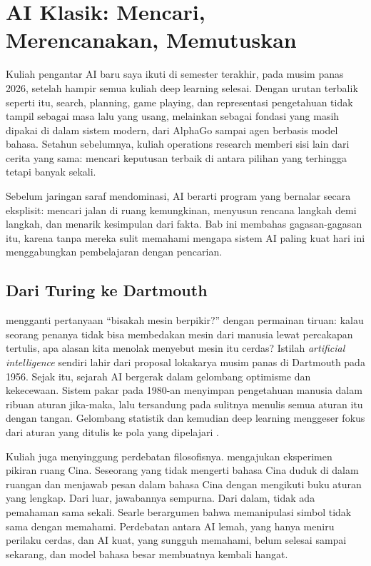 \chapter{AI Klasik: Mencari, Merencanakan, Memutuskan}
\label{ch:klasik}

Kuliah pengantar AI baru saya ikuti di semester terakhir, pada musim panas 2026, setelah hampir
semua kuliah deep learning selesai. Dengan urutan terbalik seperti itu, search, planning, game
playing, dan representasi pengetahuan tidak tampil sebagai masa lalu yang usang, melainkan sebagai
fondasi yang masih dipakai di dalam sistem modern, dari AlphaGo sampai agen berbasis model bahasa. Setahun sebelumnya, kuliah operations
research memberi sisi lain dari cerita yang sama: mencari keputusan terbaik di antara pilihan
yang terhingga tetapi banyak sekali.

Sebelum jaringan saraf mendominasi, AI berarti program yang bernalar secara eksplisit: mencari
jalan di ruang kemungkinan, menyusun rencana langkah demi langkah, dan menarik kesimpulan dari
fakta. Bab ini membahas gagasan-gagasan itu, karena tanpa mereka sulit memahami mengapa sistem AI
paling kuat hari ini menggabungkan pembelajaran dengan pencarian.

\section{Dari Turing ke Dartmouth}

\citet{turing1950} mengganti pertanyaan ``bisakah mesin berpikir?'' dengan permainan tiruan:
kalau seorang penanya tidak bisa membedakan mesin dari manusia lewat percakapan tertulis, apa
alasan kita menolak menyebut mesin itu cerdas? Istilah \emph{artificial intelligence} sendiri
lahir dari proposal lokakarya musim panas di Dartmouth pada 1956. Sejak itu, sejarah AI bergerak
dalam gelombang optimisme dan kekecewaan. Sistem pakar pada 1980-an menyimpan pengetahuan
manusia dalam ribuan aturan jika-maka, lalu tersandung pada sulitnya menulis semua aturan itu
dengan tangan. Gelombang statistik dan kemudian deep learning menggeser fokus dari aturan yang
ditulis ke pola yang dipelajari \citep{russell2021}.

Kuliah juga menyinggung perdebatan filosofisnya. \citet{searle1980} mengajukan eksperimen pikiran
ruang Cina. Seseorang yang tidak mengerti bahasa Cina duduk di dalam ruangan dan menjawab pesan
dalam bahasa Cina dengan mengikuti buku aturan yang lengkap. Dari luar, jawabannya
sempurna. Dari dalam, tidak ada pemahaman sama sekali. Searle berargumen bahwa memanipulasi simbol
tidak sama dengan memahami. Perdebatan antara AI lemah, yang hanya meniru perilaku cerdas, dan AI
kuat, yang sungguh memahami, belum selesai sampai sekarang, dan model bahasa besar membuatnya
kembali hangat.

